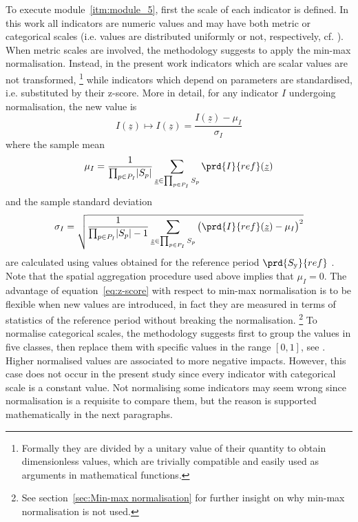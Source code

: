 To execute module~\ref{itm:module_5}, first the scale of each \gls{indicator} is defined. In this work all \glspl{indicator} are numeric values and may have both metric or categorical scales (i.e. values are distributed uniformly or not, respectively, cf. \cite[109]{2017GIZTheVulnerability}).
When metric scales are involved, the methodology suggests to apply the min-max normalisation. Instead, in the present work \glspl{indicator} which are scalar values are not transformed,%
\footnote{Formally they are divided by a unitary value of their quantity to obtain dimensionless values, which are trivially compatible and easily used as arguments in mathematical functions.}
while \glspl{indicator} which depend on parameters are standardised, i.e. substituted by their z-score. More in detail, for any \gls{indicator} $I$ undergoing normalisation, the new value is
\begin{equation}
  \label{eq:z-score}
  I(\underline{z}) \mapsto I(\underline{z}) = \frac{I(\underline{z}) - \mu_I}{\sigma_I}
\end{equation}
where the sample mean
\begin{equation}
  \label{eq:sample_mean}
  \mu_I = \frac{1}{\prod_{p \in P_I} \abs{S_p}} \sum_{\underline{z} \in \prod_{p \in P_I} S_p} \prd{I}{ref}(\underline{z})
\end{equation}
and the sample standard deviation
\begin{equation}
  \label{eq:sample_standard_deviation}
  \sigma_I = \sqrt{\frac{1}{\prod_{p \in P_I} \abs{S_p} - 1} \sum_{\underline{z} \in \prod_{p \in P_I} S_p} \big( \prd{I}{ref}(\underline{z}) - \mu_I \big)^2}
\end{equation}
are calculated using values obtained for the reference period $\prd{S_\text{y}}{ref}$ \cite[84]{2008OECDHandbookOn}. Note that the spatial aggregation procedure used above implies that $\mu_I = 0$. The advantage of equation~\eqref{eq:z-score} with respect to min-max normalisation is to be flexible when new values are introduced, in fact they are measured in terms of statistics of the reference period without breaking the normalisation.%
\footnote{See section~\ref{sec:Min-max normalisation} for further insight on why min-max normalisation is not used.}
To normalise categorical scales, the methodology suggests first to group the values in five classes, then replace them with specific values in the range $[0, 1]$, see \cite[115-116]{2017GIZTheVulnerability}. Higher normalised values are associated to more negative impacts. However, this case does not occur in the present study since every \gls{indicator} with categorical scale is a constant value. Not normalising some \glspl{indicator} may seem wrong since normalisation is a requisite to compare them, but the reason is supported mathematically in the next paragraphs.

